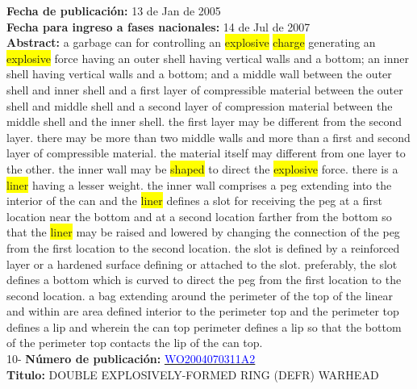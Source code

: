 \textbf{Fecha de publicación:} 13 de Jan de 2005\\ 
\textbf{Fecha para ingreso a fases nacionales:} 14 de Jul de 2007\\ 
\textbf{Abstract:} a garbage can for controlling an \colorbox{yellow}{\colorbox{yellow}{explosive}} \colorbox{yellow}{\colorbox{yellow}{charge}} generating an \colorbox{yellow}{\colorbox{yellow}{explosive}} force having an outer shell having vertical walls and a bottom; an inner shell having vertical walls and a bottom; and a middle wall between the outer shell and inner shell and a first layer of compressible material between the outer shell and middle shell and a second layer of compression material between the middle shell and the inner shell. the first layer may be different from the second layer. there may be more than two middle walls and more than a first and second layer of compressible material. the material itself may different from one layer to the other. the inner wall may be \colorbox{yellow}{shaped} to direct the \colorbox{yellow}{\colorbox{yellow}{explosive}} force. there is a \colorbox{yellow}{liner} having a lesser weight. the inner wall comprises a peg extending into the interior of the can and the \colorbox{yellow}{liner} defines a slot for receiving the peg at a first location near the bottom and at a second location farther from the bottom so that the \colorbox{yellow}{liner} may be raised and lowered by changing the connection of the peg from the first location to the second location. the slot is defined by a reinforced layer or a hardened surface defining or attached to the slot. preferably, the slot defines a bottom which is curved to direct the peg from the first location to the second location. a bag extending around the perimeter of the top of the linear and within are area defined interior to the perimeter top and the perimeter top defines a lip and wherein the can top perimeter defines a lip so that the bottom of the perimeter top contacts the lip of the can top.\\ 
 

 \vspace{1cm}10- \textbf{Número de publicación:} \href{https://worldwide.espacenet.com/publicationDetails/biblio?DB=EPODOC&II=0&ND=3&adjacent=true&locale=en_EP&FT=D&date=20160331&CC=WO&NR=2004070311A2&KC=A2#}{\textcolor{blue}{WO2004070311A2}}\\ 
\textbf{Titulo:} DOUBLE EXPLOSIVELY-FORMED RING (DEFR) WARHEAD\\ 
 
